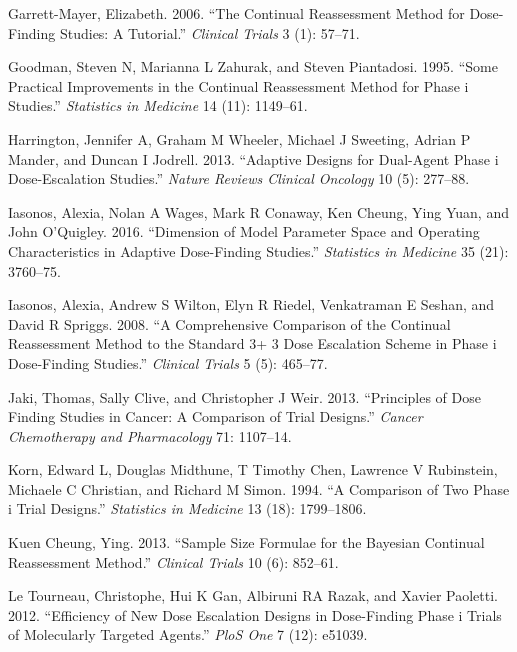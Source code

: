 \documentclass[
]{article}
\newlength{\cslhangindent}
\newlength{\cslentryspacingunit} %
\newenvironment{CSLReferences}[2] %
 {%
  \setlength{\parindent}{0pt}
  \ifodd #1
  \let\oldpar\par
  \def\par{\hangindent=\cslhangindent\oldpar}
  \fi
  \setlength{\parskip}{#2\cslentryspacingunit}
 }%
 {}
\begin{document}
\begin{CSLReferences}{1}{0}
\leavevmode{}%
Garrett-Mayer, Elizabeth. 2006. {``The Continual Reassessment Method for
Dose-Finding Studies: A Tutorial.''} \emph{Clinical Trials} 3 (1):
57--71.

\leavevmode{}%
Goodman, Steven N, Marianna L Zahurak, and Steven Piantadosi. 1995.
{``Some Practical Improvements in the Continual Reassessment Method for
Phase i Studies.''} \emph{Statistics in Medicine} 14 (11): 1149--61.

\leavevmode{}%
Harrington, Jennifer A, Graham M Wheeler, Michael J Sweeting, Adrian P
Mander, and Duncan I Jodrell. 2013. {``Adaptive Designs for Dual-Agent
Phase i Dose-Escalation Studies.''} \emph{Nature Reviews Clinical
Oncology} 10 (5): 277--88.

\leavevmode{}%
Iasonos, Alexia, Nolan A Wages, Mark R Conaway, Ken Cheung, Ying Yuan,
and John O'Quigley. 2016. {``Dimension of Model Parameter Space and
Operating Characteristics in Adaptive Dose-Finding Studies.''}
\emph{Statistics in Medicine} 35 (21): 3760--75.

\leavevmode{}%
Iasonos, Alexia, Andrew S Wilton, Elyn R Riedel, Venkatraman E Seshan,
and David R Spriggs. 2008. {``A Comprehensive Comparison of the
Continual Reassessment Method to the Standard 3+ 3 Dose Escalation
Scheme in Phase i Dose-Finding Studies.''} \emph{Clinical Trials} 5 (5):
465--77.

\leavevmode{}%
Jaki, Thomas, Sally Clive, and Christopher J Weir. 2013. {``Principles
of Dose Finding Studies in Cancer: A Comparison of Trial Designs.''}
\emph{Cancer Chemotherapy and Pharmacology} 71: 1107--14.

\leavevmode{}%
Korn, Edward L, Douglas Midthune, T Timothy Chen, Lawrence V Rubinstein,
Michaele C Christian, and Richard M Simon. 1994. {``A Comparison of Two
Phase i Trial Designs.''} \emph{Statistics in Medicine} 13 (18):
1799--1806.

\leavevmode{}%
Kuen Cheung, Ying. 2013. {``Sample Size Formulae for the Bayesian
Continual Reassessment Method.''} \emph{Clinical Trials} 10 (6):
852--61.

\leavevmode{}%
Le Tourneau, Christophe, Hui K Gan, Albiruni RA Razak, and Xavier
Paoletti. 2012. {``Efficiency of New Dose Escalation Designs in
Dose-Finding Phase i Trials of Molecularly Targeted Agents.''}
\emph{PloS One} 7 (12): e51039.


\end{CSLReferences}
\end{document}
